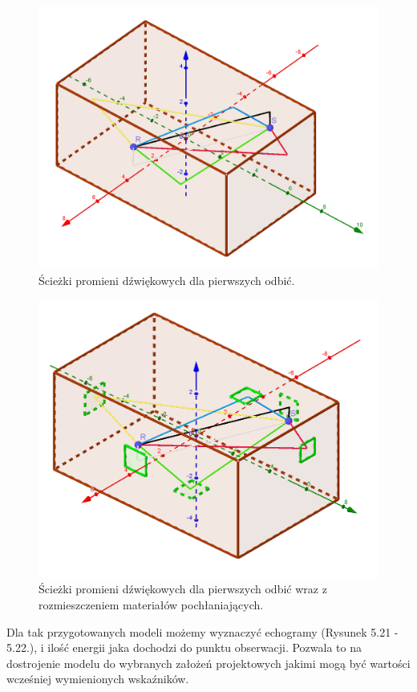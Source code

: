 \begin{figure}[h]
        \centering
                \centering
                \includegraphics[width=12cm]{1szeodbicia}
	\caption{Ścieżki promieni dźwiękowych dla pierwszych odbić.}
\end{figure}

\begin{figure}[h]
        \centering
                \centering
                \includegraphics[width=12cm]{1odbiciazpoch}
	\caption{Ścieżki promieni dźwiękowych dla pierwszych odbić wraz z rozmieszczeniem materiałów pochłaniających.}
\end{figure}

Dla tak przygotowanych modeli możemy wyznaczyć echogramy (Rysunek 5.21 - 5.22.), i ilość energii jaka dochodzi do punktu obserwacji. Pozwala to na dostrojenie modelu do wybranych założeń projektowych jakimi mogą być wartości wcześniej wymienionych wskaźników.

